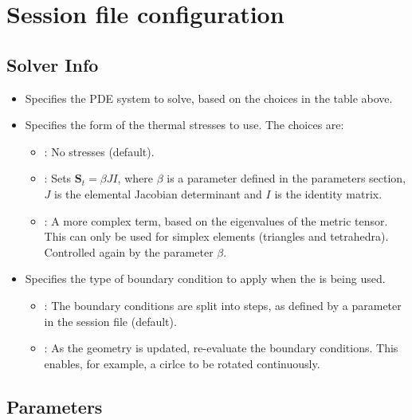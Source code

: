 \section{Session file configuration}
\subsection{Solver Info}
\begin{itemize}
  \item {} Specifies the PDE system to solve, based on the choices
  in the table above.
  \item {} Specifies the form of the thermal stresses to
  use. The choices are:
  \begin{itemize}
    \item {}: No stresses (default).
    \item {}: Sets $\mathbf{S}_t = \beta JI$, where $\beta$ is a
    parameter defined in the parameters section, $J$ is the elemental Jacobian
    determinant and $I$ is the identity matrix.
    \item {}: A more complex term, based on the eigenvalues of the
    metric tensor. This can only be used for simplex elements (triangles and
    tetrahedra). Controlled again by the parameter $\beta$.
  \end{itemize}
  \item {} Specifies the type of boundary condition to apply when
  the  is being used.
  \begin{itemize}
    \item {}: The boundary conditions are split into
     steps, as defined by a parameter in the session file
    (default).
    \item {}: As the geometry is updated, re-evaluate the boundary
    conditions. This enables, for example, a cirlce to be rotated continuously.
  \end{itemize}
\end{itemize}

\subsection{Parameters}


